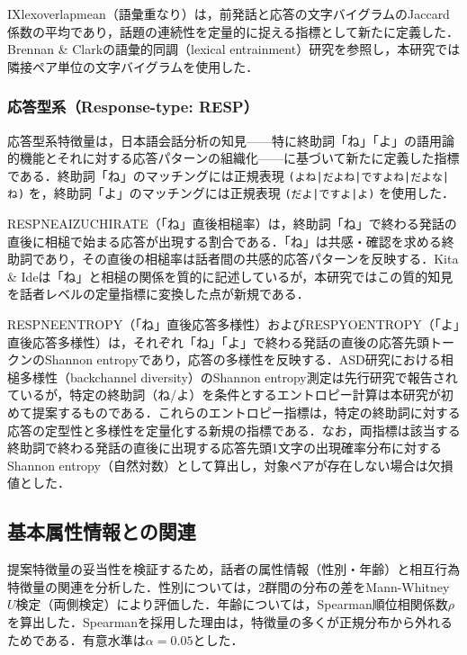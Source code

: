 \documentclass[dvipdfmx,11pt,a4paper]{bxjsarticle}
\renewcommand{\_}{\paperorigunderscore\allowbreak}%
\begin{document}
IX\_lex\_overlap\_mean（語彙重なり）は，前発話と応答の文字バイグラムのJaccard係数の平均であり，話題の連続性を定量的に捉える指標として新たに定義した．Brennan \& Clark\cite{brennan1996}の語彙的同調（lexical entrainment）研究を参照し，本研究では隣接ペア単位の文字バイグラムを使用した．

\subsubsection{応答型系（Response-type: RESP）}
応答型系特徴量は，日本語会話分析の知見——特に終助詞「ね」「よ」の語用論的機能とそれに対する応答パターンの組織化——に基づいて新たに定義した指標である．終助詞「ね」のマッチングには正規表現 \texttt{(よね|だよね|ですよね|だよな|ね)} を，終助詞「よ」のマッチングには正規表現 \texttt{(だよ|ですよ|よ)} を使用した．

RESP\_NE\_AIZUCHI\_RATE（「ね」直後相槌率）は，終助詞「ね」で終わる発話の直後に相槌で始まる応答が出現する割合である．「ね」は共感・確認を求める終助詞であり，その直後の相槌率は話者間の共感的応答パターンを反映する．Kita \& Ide\cite{kita2007}は「ね」と相槌の関係を質的に記述しているが，本研究ではこの質的知見を話者レベルの定量指標に変換した点が新規である．

RESP\_NE\_ENTROPY（「ね」直後応答多様性）およびRESP\_YO\_ENTROPY（「よ」直後応答多様性）は，それぞれ「ね」「よ」で終わる発話の直後の応答先頭トークンのShannon entropyであり，応答の多様性を反映する．ASD研究における相槌多様性（backchannel diversity）のShannon entropy測定は先行研究で報告されているが\cite{wehrle2024}，特定の終助詞（ね/よ）を条件とするエントロピー計算は本研究が初めて提案するものである．これらのエントロピー指標は，特定の終助詞に対する応答の定型性と多様性を定量化する新規の指標である．なお，両指標は該当する終助詞で終わる発話の直後に出現する応答先頭1文字の出現確率分布に対するShannon entropy（自然対数）として算出し，対象ペアが存在しない場合は欠損値とした．


\subsection{基本属性情報との関連}
\label{sec:pred_demographic}

提案特徴量の妥当性を検証するため，話者の属性情報（性別・年齢）と相互行為特徴量の関連を分析した．性別については，2群間の分布の差をMann-Whitney $U$検定（両側検定）により評価した．年齢については，Spearman順位相関係数$\rho$を算出した．Spearmanを採用した理由は，特徴量の多くが正規分布から外れるためである．有意水準は$\alpha = 0.05$とした．
\end{document}
